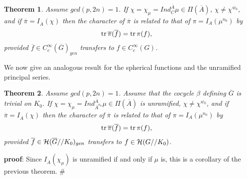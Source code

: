 \documentclass[twocolumn,10pt]{article}
\newtheorem{theorem}{Theorem}
\begin{document}
\begin{theorem}
Assume $gcd(p,2n)=1$.
If $\chi=\chi_\mu=Ind_{\overline{C}}^{\overline{A}}\mu \in 
\Pi (\overline{A})$, $\chi \neq \chi ^{\overline{w_0}}$, and if 
$\overline{\pi} =I_{\overline{A}}(\chi)$
then the character of $\overline{\pi}$ is related to that of
$\pi =I_{A}(\mu^{n_0} )$ by
\[
{\rm tr}\,\overline{\pi}(\overline{f})
={\rm tr}\,\pi(f),
\]
provided $\overline{f}\in C_c^\infty(\overline{G})_{gen}$ 
transfers to $f\in C_c^\infty(G)$.
\label{thrm:main1}
\end{theorem}
 
We now give an analogous result for the 
spherical functions and the unramified principal series.

\begin{theorem}
Assume $gcd(p,2n)=1$.
Assume that the cocycle $\beta$ defining $\overline{G}$
is trivial on $K_0$. If $\chi=\chi_\mu=
Ind_{\overline{A}^{n_0}}^{\overline{A}}\mu \in 
\Pi (\overline{A})$ is unramified, $\chi \neq \chi ^{\overline{w_0}}$, and if 
$\overline{\pi} =I_{\overline{A}}(\chi)$
then the character of $\overline{\pi}$ is related to that of
$\pi =I_{A}(\mu^{n_0} )$ by
\[
{\rm tr}\,\overline{\pi}(\overline{f})
={\rm tr}\,\pi(f),
\]
provided $\overline{f}\in 
{\cal H}(\overline{G}//K_0)_{gen}$
transfers to $f\in {\cal H}(G//K_0)$.
\label{thrm:main2}
\end{theorem}

{\bf proof}: Since $I_{\overline{A}}(\chi_\mu)$ is unramified
if and only if $\mu$ is, this is a corollary of the previous theorem. 
$\#$
\end{document}
